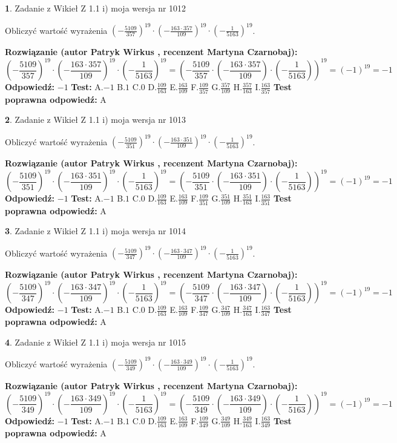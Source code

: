 \documentclass[12pt, a4paper]{article}
\theoremstyle{definition} %
\newtheorem{zad}{}
\newcommand{\zadStart}[1]{\begin{zad}#1\newline}
\newcommand{\zadStop}{\end{zad}}
\newcommand{\rozwStart}[2]{\noindent \textbf{Rozwiązanie (autor #1 , recenzent #2): }\newline}
\newcommand{\rozwStop}{\newline}
\newcommand{\odpStart}{\noindent \textbf{Odpowiedź:}\newline}
\newcommand{\odpStop}{\newline}
\newcommand{\testStart}{\noindent \textbf{Test:}\newline}
\newcommand{\testStop}{\newline}
\newcommand{\kluczStart}{\noindent \textbf{Test poprawna odpowiedź:}\newline}
\newcommand{\kluczStop}{\newline}
\begin{document}
\zadStart{Zadanie z Wikieł Z 1.1 i) moja wersja nr 1012}

Obliczyć wartość wyrażenia $(-\frac{5109}{357})^{19} \cdot (-\frac{163 \cdot 357}{109})^{19} \cdot (-\frac{1}{5163})^{19}$.
\zadStop
\rozwStart{Patryk Wirkus}{Martyna Czarnobaj}
$$(-\frac{5109}{357})^{19} \cdot (-\frac{163 \cdot 357}{109})^{19} \cdot (-\frac{1}{5163})^{19} = (-\frac{5109}{357} \cdot (-\frac{163 \cdot 357}{109}) \cdot (-\frac{1}{5163}))^{19} = (-1)^{19} = -1$$
\rozwStop
\odpStart
$-1$
\odpStop
\testStart
A.$-1$ B.$1$ C.$0$ D.$\frac{109}{163}$ E.$\frac{163}{109}$
F.$\frac{109}{357}$ G.$\frac{357}{109}$
H.$\frac{357}{163}$
I.$\frac{163}{357}$
\testStop
\kluczStart
A
\kluczStop



\zadStart{Zadanie z Wikieł Z 1.1 i) moja wersja nr 1013}

Obliczyć wartość wyrażenia $(-\frac{5109}{351})^{19} \cdot (-\frac{163 \cdot 351}{109})^{19} \cdot (-\frac{1}{5163})^{19}$.
\zadStop
\rozwStart{Patryk Wirkus}{Martyna Czarnobaj}
$$(-\frac{5109}{351})^{19} \cdot (-\frac{163 \cdot 351}{109})^{19} \cdot (-\frac{1}{5163})^{19} = (-\frac{5109}{351} \cdot (-\frac{163 \cdot 351}{109}) \cdot (-\frac{1}{5163}))^{19} = (-1)^{19} = -1$$
\rozwStop
\odpStart
$-1$
\odpStop
\testStart
A.$-1$ B.$1$ C.$0$ D.$\frac{109}{163}$ E.$\frac{163}{109}$
F.$\frac{109}{351}$ G.$\frac{351}{109}$
H.$\frac{351}{163}$
I.$\frac{163}{351}$
\testStop
\kluczStart
A
\kluczStop



\zadStart{Zadanie z Wikieł Z 1.1 i) moja wersja nr 1014}

Obliczyć wartość wyrażenia $(-\frac{5109}{347})^{19} \cdot (-\frac{163 \cdot 347}{109})^{19} \cdot (-\frac{1}{5163})^{19}$.
\zadStop
\rozwStart{Patryk Wirkus}{Martyna Czarnobaj}
$$(-\frac{5109}{347})^{19} \cdot (-\frac{163 \cdot 347}{109})^{19} \cdot (-\frac{1}{5163})^{19} = (-\frac{5109}{347} \cdot (-\frac{163 \cdot 347}{109}) \cdot (-\frac{1}{5163}))^{19} = (-1)^{19} = -1$$
\rozwStop
\odpStart
$-1$
\odpStop
\testStart
A.$-1$ B.$1$ C.$0$ D.$\frac{109}{163}$ E.$\frac{163}{109}$
F.$\frac{109}{347}$ G.$\frac{347}{109}$
H.$\frac{347}{163}$
I.$\frac{163}{347}$
\testStop
\kluczStart
A
\kluczStop



\zadStart{Zadanie z Wikieł Z 1.1 i) moja wersja nr 1015}

Obliczyć wartość wyrażenia $(-\frac{5109}{349})^{19} \cdot (-\frac{163 \cdot 349}{109})^{19} \cdot (-\frac{1}{5163})^{19}$.
\zadStop
\rozwStart{Patryk Wirkus}{Martyna Czarnobaj}
$$(-\frac{5109}{349})^{19} \cdot (-\frac{163 \cdot 349}{109})^{19} \cdot (-\frac{1}{5163})^{19} = (-\frac{5109}{349} \cdot (-\frac{163 \cdot 349}{109}) \cdot (-\frac{1}{5163}))^{19} = (-1)^{19} = -1$$
\rozwStop
\odpStart
$-1$
\odpStop
\testStart
A.$-1$ B.$1$ C.$0$ D.$\frac{109}{163}$ E.$\frac{163}{109}$
F.$\frac{109}{349}$ G.$\frac{349}{109}$
H.$\frac{349}{163}$
I.$\frac{163}{349}$
\testStop
\kluczStart
A
\kluczStop
\end{document}
